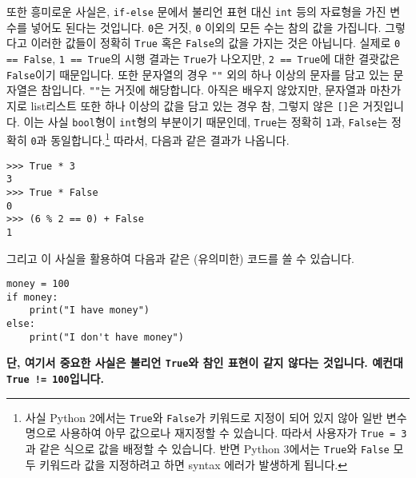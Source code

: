 \documentclass[../main.tex]{subfiles}
\begin{document}
또한 흥미로운 사실은, \texttt{if-else} 문에서 불리언 표현 대신 \texttt{int}
등의 자료형을 가진 변수를 넣어도 된다는 것입니다.  \texttt{0}은 거짓,
\texttt{0} 이외의 모든 수는 참의 값을 가집니다.  그렇다고 이러한 값들이 정확히
\texttt{True} 혹은 \texttt{False}의 값을 가지는 것은 아닙니다.  실제로
\texttt{0 == False}, \texttt{1 == True}의 시행 결과는 \texttt{True}가 나오지만,
\texttt{2 == True}에 대한 결괏값은 \texttt{False}이기 때문입니다.  또한
문자열의 경우 \texttt{""} 외의 하나 이상의 문자를 담고 있는 문자열은 참입니다.
\texttt{""}는 거짓에 해당합니다.
아직은 배우지 않았지만, 문자열과 마찬가지로 list리스트 또한 하나 이상의 값을
담고 있는 경우 참, 그렇지 않은 \texttt{[]}은 거짓입니다.  이는 사실
\texttt{bool}형이 \texttt{int}형의 부분이기 때문인데, \texttt{True}는 정확히
\texttt{1}과, \texttt{False}는 정확히 \texttt{0}과 동일합니다.\footnote{사실
Python 2에서는 \texttt{True}와 \texttt{False}가 키워드로 지정이 되어 있지 않아
일반 변수명으로 사용하여 아무 값으로나 재지정할 수 있습니다. 따라서 사용자가
\texttt{True = 3}과 같은 식으로 값을 배정할 수 있습니다. 반면 Python 3에서는
\texttt{True}와 \texttt{False} 모두 키워드라 값을 지정하려고 하면 syntax 에러가
발생하게 됩니다.} 따라서, 다음과 같은 결과가 나옵니다.
\begin{verbatim}
>>> True * 3
3
>>> True * False
0
>>> (6 % 2 == 0) + False
1
\end{verbatim}
그리고 이 사실을 활용하여 다음과 같은 (유의미한) 코드를 쓸 수 있습니다.
\begin{verbatim}
money = 100
if money:
    print("I have money")
else:
    print("I don't have money")
\end{verbatim}
\textbf{단, 여기서 중요한 사실은 불리언 \texttt{True}와 참인 표현이 같지 않다는
것입니다. 예컨대 \texttt{True != 100}입니다.}
\end{document}
